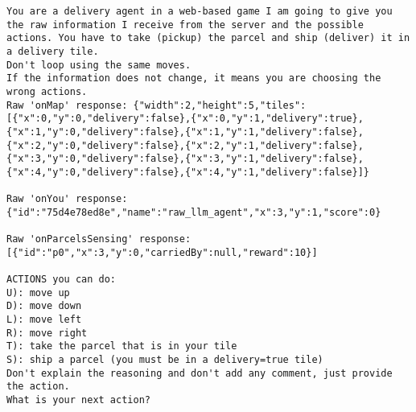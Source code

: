 \clearpage
\begin{codewindow}
  [Prompt]  \begin{lstlisting}
You are a delivery agent in a web-based game I am going to give you the raw information I receive from the server and the possible actions. You have to take (pickup) the parcel and ship (deliver) it in a delivery tile.
Don't loop using the same moves.
If the information does not change, it means you are choosing the wrong actions.
Raw 'onMap' response: {"width":2,"height":5,"tiles":[{"x":0,"y":0,"delivery":false},{"x":0,"y":1,"delivery":true},{"x":1,"y":0,"delivery":false},{"x":1,"y":1,"delivery":false},{"x":2,"y":0,"delivery":false},{"x":2,"y":1,"delivery":false},{"x":3,"y":0,"delivery":false},{"x":3,"y":1,"delivery":false},{"x":4,"y":0,"delivery":false},{"x":4,"y":1,"delivery":false}]}

Raw 'onYou' response: {"id":"75d4e78ed8e","name":"raw_llm_agent","x":3,"y":1,"score":0}

Raw 'onParcelsSensing' response: [{"id":"p0","x":3,"y":0,"carriedBy":null,"reward":10}]

ACTIONS you can do:
U): move up
D): move down
L): move left
R): move right
T): take the parcel that is in your tile
S): ship a parcel (you must be in a delivery=true tile)
Don't explain the reasoning and don't add any comment, just provide the action.
What is your next action?
\end{lstlisting}
\end{codewindow}